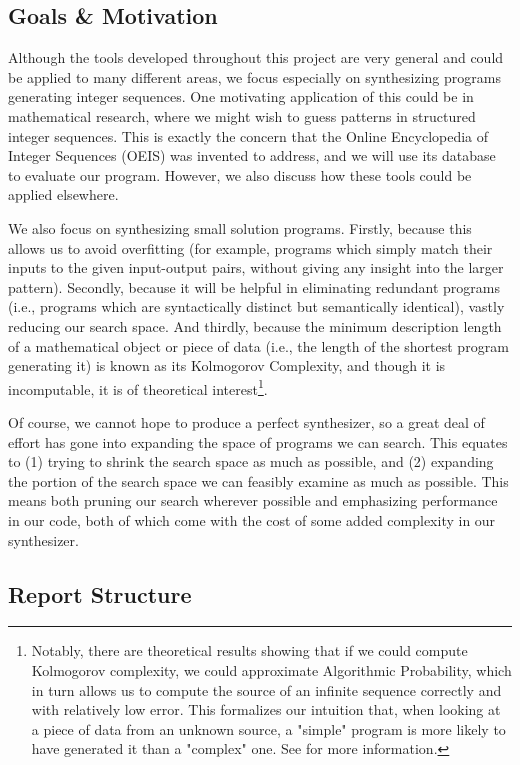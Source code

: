 \subsection{Goals \& Motivation}

Although the tools developed throughout this project are very general and could be applied to many different areas, we focus especially on synthesizing programs generating integer sequences. One motivating application of this could be in mathematical research, where we might wish to guess patterns in structured integer sequences. This is exactly the concern that the Online Encyclopedia of Integer Sequences (OEIS) was invented to address, and we will use its database to evaluate our program. However, we also discuss how these tools could be applied elsewhere.

We also focus on synthesizing small solution programs. Firstly, because this allows us to avoid overfitting (for example, programs which simply match their inputs to the given input-output pairs, without giving any insight into the larger pattern). Secondly, because it will be helpful in eliminating redundant programs (i.e., programs which are syntactically distinct but semantically identical), vastly reducing our search space. And thirdly, because the minimum description length of a mathematical object or piece of data (i.e., the length of the shortest program generating it) is known as its Kolmogorov Complexity, and though it is incomputable, it is of theoretical interest\footnote{Notably, there are theoretical results showing that if we could compute Kolmogorov complexity, we could approximate Algorithmic Probability, which in turn allows us to compute the source of an infinite sequence correctly and with relatively low error. This formalizes our intuition that, when looking at a piece of data from an unknown source, a "simple" program is more likely to have generated it than a "complex" one. See \cite{Solomonoff} for more information.}.

Of course, we cannot hope to produce a perfect synthesizer, so a great deal of effort has gone into expanding the space of programs we can search. This equates to (1) trying to shrink the search space as much as possible, and (2) expanding the portion of the search space we can feasibly examine as much as possible. This means both pruning our search wherever possible and emphasizing performance in our code, both of which come with the cost of some added complexity in our synthesizer.

\subsection{Report Structure}

